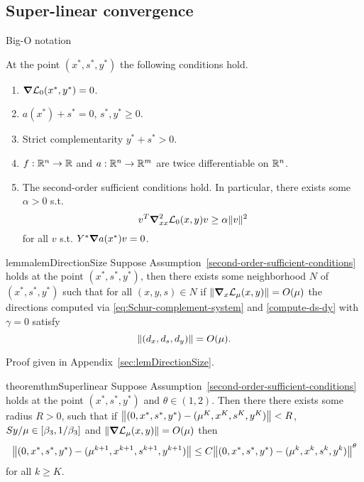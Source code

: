 \documentclass{article}
\begin{document}
\if{}

\subsection{Super-linear convergence}


\begin{definition}
Big-O notation
\end{definition}

\begin{assumption}\label{second-order-sufficient-conditions}
At the point $(x^{*},s^{*},y^{*})$ the following conditions hold.
\begin{enumerate}
\item $\grad \mathcal{L}_{0}(x^{*}, y^{*}) = 0$.
\item $a(x^{*}) + s^{*} = 0$, $s^{*}, y^{*} \ge 0$.
\item Strict complementarity $y^{*} + s^{*} > 0$.
\item $f : \mathbb{R}^{n} \rightarrow \mathbb{R}$ and $a : \mathbb{R}^{n} \rightarrow \mathbb{R}^{m}$ are twice differentiable on $\mathbb{R}^{n}$.
\item The second-order sufficient conditions hold. In particular, there exists some $\alpha > 0$ s.t.
$$
v^T \grad^2_{xx} \mathcal{L}_{0}(x,y) v \ge \alpha \| v \|^2
$$
for all $v$ s.t. $Y^{*} \grad a(x^{*}) v = 0$.
\end{enumerate}
\end{assumption}

\begin{restatable}{lemma}{lemDirectionSize}\label{lemDirectionSize}
Suppose Assumption~\ref{second-order-sufficient-conditions} holds at the point $(x^{*}, s^{*}, y^{*})$, then there exists some neighborhood $N$ of $(x^{*},s^{*},y^{*})$ such that for all $(x,y,s) \in N$ if $\| \grad_{x} \mathcal{L}_{\mu}(x,y) \|  = O(\mu)$ the directions computed via \eqref{eq:Schur-complement-system} and \eqref{compute-ds-dy} with  $\gamma = 0$ satisfy 
$$\| (d_{x}, d_{s}, d_{y}) \| =  O( \mu  ).$$
\end{restatable}

Proof given in Appendix~\ref{sec:lemDirectionSize}.

\begin{restatable}{theorem}{thmSuperlinear}\label{thmSuperlinear}
Suppose Assumption~\ref{second-order-sufficient-conditions} holds at the point $(x^{*}, s^{*}, y^{*})$ and $\theta \in (1,2)$. Then there there exists some radius $R > 0$, such that if  $\norm{ (0,x^{*},s^{*},y^{*}) - (\mu^K,x^K,s^K,y^K) } < R$, $Sy / \mu \in [\beta_{3}, 1/\beta_{3}]$
and $\norm{ \grad \mathcal{L}_{\mu}(x,y) } = O(\mu)$ 
then
$$
\norm{(0,x^{*},s^{*},y^{*}) - (\mu^{k+1},x^{k+1},s^{k+1},y^{k+1})} \le C \norm{ (0,x^{*},s^{*},y^{*}) - (\mu^{k},x^{k},s^{k},y^{k}) }^{\theta}
$$
for all $k \ge K$.
\end{restatable}
\end{document}
